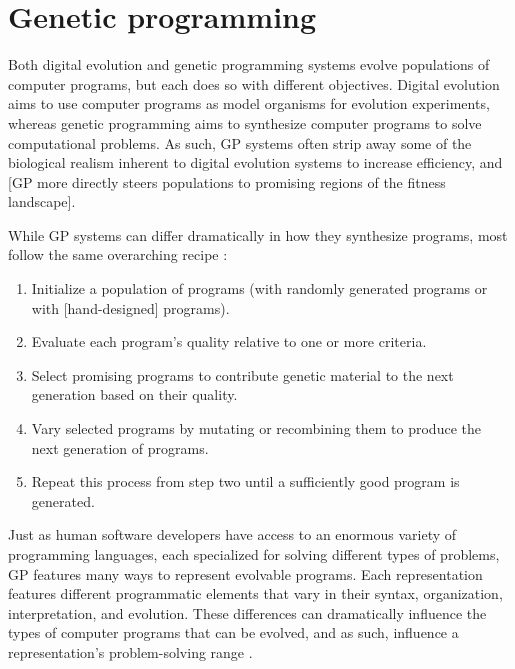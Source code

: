 \section{Genetic programming}


Both digital evolution and genetic programming systems evolve populations of computer programs, but each does so with different objectives.
Digital evolution aims to use computer programs as model organisms for evolution experiments, whereas genetic programming aims to synthesize computer programs to solve computational problems.
As such, GP systems often strip away some of the biological realism inherent to digital evolution systems to increase efficiency, and [GP more directly steers populations to promising regions of the fitness landscape].

While GP systems can differ dramatically in how they synthesize programs, most follow the same overarching recipe \citep{ofria_avida:_2009}:

\begin{displayquote}
\begin{enumerate}
    \item Initialize a population of programs (with randomly generated programs or with [hand-designed] programs).
    \item Evaluate each program's quality relative to one or more criteria.
    \item Select promising programs to contribute genetic material to the next generation based on their quality.
    \item Vary selected programs by mutating or recombining them to produce the next generation of programs. 
    \item Repeat this process from step two until a sufficiently good program is generated.
\end{enumerate}
\end{displayquote}

Just as human software developers have access to an enormous variety of programming languages, each specialized for solving different types of problems, GP features many ways to represent evolvable programs.
Each representation features different programmatic elements that vary in their syntax, organization, interpretation, and evolution.
These differences can dramatically influence the types of computer programs that can be evolved, and as such, influence a representation's problem-solving range \citep{hintze_buffet_2019,wilson_comparison_2008}. 

